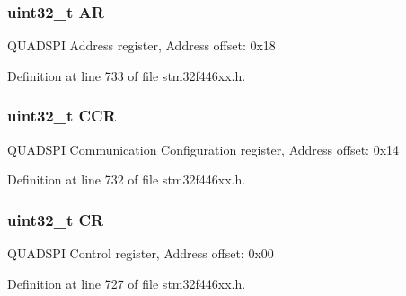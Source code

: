 \subsubsection[{\texorpdfstring{AR}{AR}}]{ uint32\+\_\+t AR}\hypertarget{struct_q_u_a_d_s_p_i___type_def_a2ac50357d1ebac2949d27bfc4855e6a4}{}\label{struct_q_u_a_d_s_p_i___type_def_a2ac50357d1ebac2949d27bfc4855e6a4}
Q\+U\+A\+D\+S\+PI Address register, Address offset\+: 0x18 

Definition at line 733 of file stm32f446xx.\+h.

\subsubsection[{\texorpdfstring{C\+CR}{CCR}}]{ uint32\+\_\+t C\+CR}\hypertarget{struct_q_u_a_d_s_p_i___type_def_a5e1322e27c40bf91d172f9673f205c97}{}\label{struct_q_u_a_d_s_p_i___type_def_a5e1322e27c40bf91d172f9673f205c97}
Q\+U\+A\+D\+S\+PI Communication Configuration register, Address offset\+: 0x14 

Definition at line 732 of file stm32f446xx.\+h.

\subsubsection[{\texorpdfstring{CR}{CR}}]{ uint32\+\_\+t CR}\hypertarget{struct_q_u_a_d_s_p_i___type_def_ab40c89c59391aaa9d9a8ec011dd0907a}{}\label{struct_q_u_a_d_s_p_i___type_def_ab40c89c59391aaa9d9a8ec011dd0907a}
Q\+U\+A\+D\+S\+PI Control register, Address offset\+: 0x00 

Definition at line 727 of file stm32f446xx.\+h.

